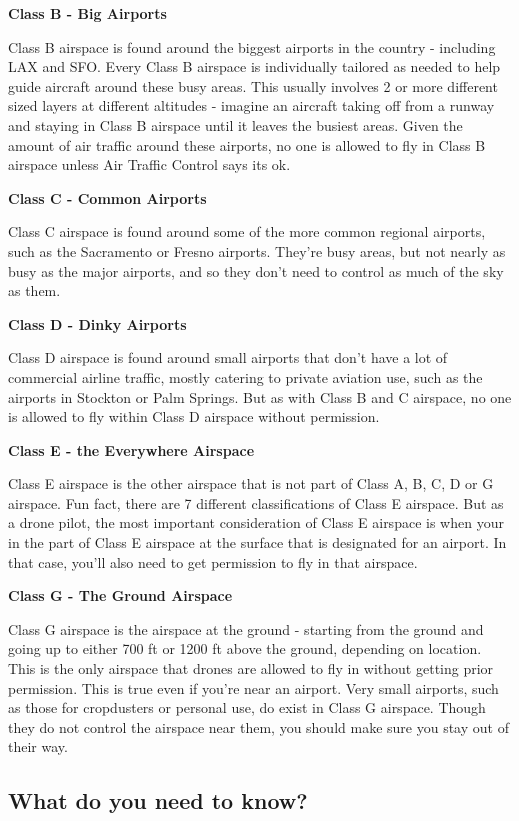 \documentclass[
  12pt,
]{book}
\begin{document}
\textbf{Class B - Big Airports}

Class B airspace is found around the biggest airports in the country - including LAX and SFO. Every Class B airspace is individually tailored as needed to help guide aircraft around these busy areas. This usually involves 2 or more different sized layers at different altitudes - imagine an aircraft taking off from a runway and staying in Class B airspace until it leaves the busiest areas. Given the amount of air traffic around these airports, no one is allowed to fly in Class B airspace unless Air Traffic Control says its ok.

\textbf{Class C - Common Airports}

Class C airspace is found around some of the more common regional airports, such as the Sacramento or Fresno airports. They're busy areas, but not nearly as busy as the major airports, and so they don't need to control as much of the sky as them.

\textbf{Class D - Dinky Airports}

Class D airspace is found around small airports that don't have a lot of commercial airline traffic, mostly catering to private aviation use, such as the airports in Stockton or Palm Springs. But as with Class B and C airspace, no one is allowed to fly within Class D airspace without permission.

\textbf{Class E - the Everywhere Airspace}

Class E airspace is the other airspace that is not part of Class A, B, C, D or G airspace. Fun fact, there are 7 different classifications of Class E airspace. But as a drone pilot, the most important consideration of Class E airspace is when your in the part of Class E airspace at the surface that is designated for an airport. In that case, you'll also need to get permission to fly in that airspace.

\textbf{Class G - The Ground Airspace}

Class G airspace is the airspace at the ground - starting from the ground and going up to either 700 ft or 1200 ft above the ground, depending on location. This is the only airspace that drones are allowed to fly in without getting prior permission. This is true even if you're near an airport. Very small airports, such as those for cropdusters or personal use, do exist in Class G airspace. Though they do not control the airspace near them, you should make sure you stay out of their way.

\subsection{What do you need to know?}\label{what-do-you-need-to-know}
\end{document}
